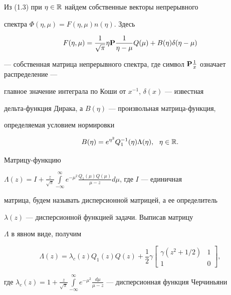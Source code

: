 Из (1.3) при $\eta\in\Bbb R$ найдем собственные векторы непрерывного 


спектра $\Phi(\eta,\mu)=F(\eta,\mu)n(\eta)$. Здесь 


\begin{equation} 


F(\eta,\mu)=\frac{1}{\sqrt{\pi}}\eta\bold P\frac{1}{\eta-\mu} 


Q(\mu)+B(\eta)\delta(\eta-\mu) 


\end{equation} 


--- собственная матрица непрерывного спектра, где символ $\bold 


P\frac{1}{x}$ означает распределение --- 


главное значение интеграла по Коши от $x^{-1}$, $\delta(x)$ --- известная 


дельта-функция Дирака, а $B(\eta)$ --- произвольная матрица-функция, 


определяемая условием нормировки 


$$ 


B(\eta)=e^{\eta^2}Q^{-1}_1(\eta)\Lambda(\eta),\ \ \eta\in\Bbb R. 


$$ 


Матрицу-функцию 


$\Lambda(z)=I+\frac{z}{\sqrt{\pi}}\int\limits^\infty_{-\infty} 


e^{-\mu^2}\frac{Q_1(\mu)Q(\mu)}{\mu-z}d\mu$, где $I$ --- единичная 


матрица, будем называть дисперсионной матрицей, а ее определитель 


$\lambda(z)$ --- дисперсионной функцией задачи. Выписав матрицу 


$\Lambda$ в явном виде, получим 


\begin{equation} 


\Lambda(z)=\lambda_c(z)Q_1(z)Q(z)+\frac{1}{2}\gamma 


\begin{bmatrix} 


\gamma(z^2+1/2) & 1 \\ 1 & 0 \end{bmatrix}, 


\end{equation} 


где $\lambda_c(z)=1+\frac{z}{\sqrt{\pi}}\int\limits^\infty_{-\infty} 


e^{-\mu^2}\frac{d\mu}{\mu-z}$ --- дисперсионная функция Черчиньяни 



